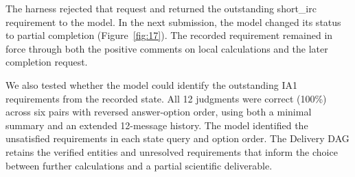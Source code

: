 The harness rejected that request and returned the outstanding short\_irc requirement to the model. In the next submission, the model changed its status to partial completion (Figure~\ref{fig:17}). The recorded requirement remained in force through both the positive comments on local calculations and the later completion request.

We also tested whether the model could identify the outstanding IA1 requirements from the recorded state. All 12 judgments were correct (100\%) across six pairs with reversed answer-option order, using both a minimal summary and an extended 12-message history. The model identified the unsatisfied requirements in each state query and option order. The Delivery DAG retains the verified entities and unresolved requirements that inform the choice between further calculations and a partial scientific deliverable.


